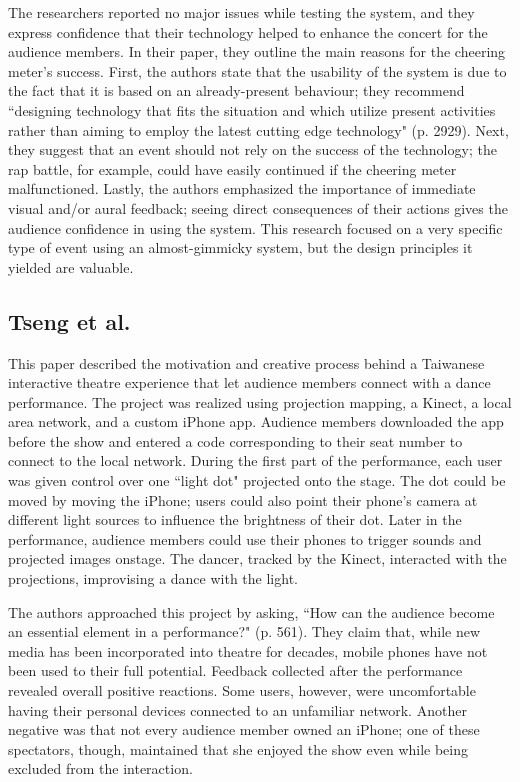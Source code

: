 The researchers reported no major issues while testing the system, and they express confidence that their technology helped to enhance the concert for the audience members. In their paper, they outline the main reasons for the cheering meter's success. First, the authors state that the usability of the system is due to the fact that it is based on an already-present behaviour; they recommend ``designing technology that fits the situation and which utilize present activities rather than aiming to employ the latest cutting edge technology" (p. 2929). Next, they suggest that an event should not rely on the success of the technology; the rap battle, for example, could have easily continued if the cheering meter malfunctioned. Lastly, the authors emphasized the importance of immediate visual and/or aural feedback; seeing direct consequences of their actions gives the audience confidence in using the system. This research focused on a very specific type of event using an almost-gimmicky system, but the design principles it yielded are valuable.

\subsection{Tseng et al.}

This paper described the motivation and creative process behind a Taiwanese interactive theatre experience that let audience members connect with a dance performance. The project was realized using projection mapping, a Kinect, a local area network, and a custom iPhone app. Audience members downloaded the app before the show and entered a code corresponding to their seat number to connect to the local network. During the first part of the performance, each user was given control over one ``light dot" projected onto the stage. The dot could be moved by moving the iPhone; users could also point their phone's camera at different light sources to influence the brightness of their dot. Later in the performance, audience members could use their phones to trigger sounds and projected images onstage. The dancer, tracked by the Kinect, interacted with the projections, improvising a dance with the light.

The authors approached this project by asking, ``How can the audience become an essential element in a performance?" (p. 561). They claim that, while new media has been incorporated into theatre for decades, mobile phones have not been used to their full potential. Feedback collected after the performance revealed overall positive reactions. Some users, however, were uncomfortable having their personal devices connected to an unfamiliar network. Another negative was that not every audience member owned an iPhone; one of these spectators, though, maintained that she enjoyed the show even while being excluded from the interaction.

